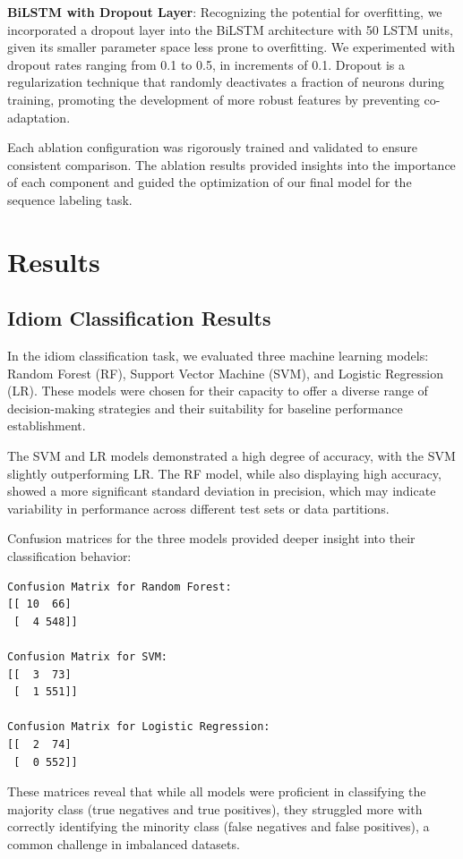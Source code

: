 \documentclass[conference]{IEEEtran}
\begin{document}
\textbf{BiLSTM with Dropout Layer}: Recognizing the potential for overfitting, we incorporated a dropout layer into the BiLSTM architecture with 50 LSTM units, given its smaller parameter space less prone to overfitting. We experimented with dropout rates ranging from 0.1 to 0.5, in increments of 0.1. Dropout is a regularization technique that randomly deactivates a fraction of neurons during training, promoting the development of more robust features by preventing co-adaptation.

Each ablation configuration was rigorously trained and validated to ensure consistent comparison. The ablation results provided insights into the importance of each component and guided the optimization of our final model for the sequence labeling task.

\section{Results}

\subsection{Idiom Classification Results}
In the idiom classification task, we evaluated three machine learning models: Random Forest (RF), Support Vector Machine (SVM), and Logistic Regression (LR). These models were chosen for their capacity to offer a diverse range of decision-making strategies and their suitability for baseline performance establishment.

The SVM and LR models demonstrated a high degree of accuracy, with the SVM slightly outperforming LR. The RF model, while also displaying high accuracy, showed a more significant standard deviation in precision, which may indicate variability in performance across different test sets or data partitions.

Confusion matrices for the three models provided deeper insight into their classification behavior:
\begin{verbatim}
Confusion Matrix for Random Forest:
[[ 10  66]
 [  4 548]]

Confusion Matrix for SVM:
[[  3  73]
 [  1 551]]

Confusion Matrix for Logistic Regression:
[[  2  74]
 [  0 552]]
\end{verbatim}

These matrices reveal that while all models were proficient in classifying the majority class (true negatives and true positives), they struggled more with correctly identifying the minority class (false negatives and false positives), a common challenge in imbalanced datasets.
\end{document}
